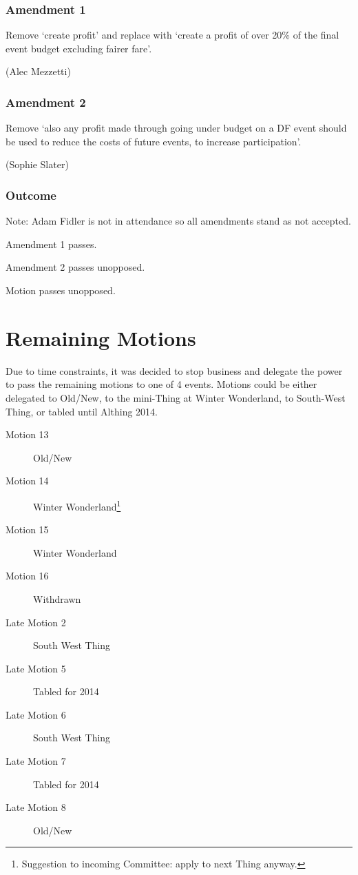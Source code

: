 \documentclass[a4paper, 11pt]{article} %
\begin{document}
\subsubsection{Amendment 1}

Remove `create profit' and replace with `create a profit of over 20\% of the final event budget excluding fairer fare'.

(Alec Mezzetti)

\subsubsection{Amendment 2}

Remove `also any profit made through going under budget on a DF event should be used to reduce the costs of future events, to increase participation'.

(Sophie Slater)

\subsubsection{Outcome}

Note: Adam Fidler is not in attendance so all amendments stand as not accepted.

Amendment 1 passes.

Amendment 2 passes unopposed.

Motion passes unopposed.

\section{Remaining Motions}

Due to time constraints, it was decided to stop business and delegate the power to pass the remaining motions to one of 4 events.  Motions could be either delegated to Old/New, to the mini-Thing at Winter Wonderland, to South-West Thing, or tabled until Althing 2014.

\begin{description}
\item[Motion 13] Old/New
\item[Motion 14] Winter Wonderland\footnote{Suggestion to incoming Committee: apply to next Thing anyway.}
\item[Motion 15] Winter Wonderland
\item[Motion 16] Withdrawn
\item[Late Motion 2] South West Thing
\item[Late Motion 5] Tabled for 2014
\item[Late Motion 6] South West Thing
\item[Late Motion 7] Tabled for 2014
\item[Late Motion 8] Old/New
\end{description}
\end{document}
